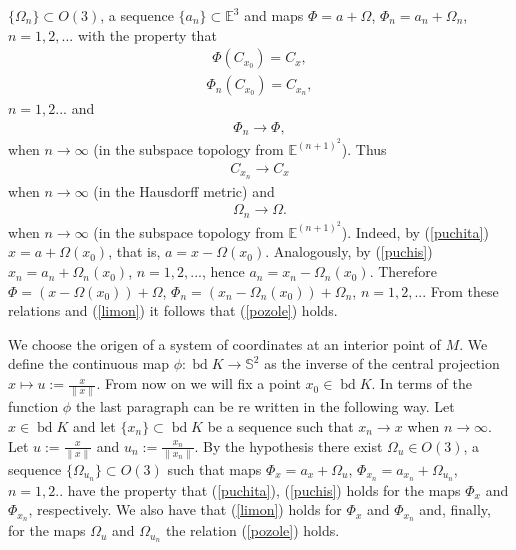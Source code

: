 \documentclass[12pt]{amsart}
\newcommand{\bd}{\operatorname*{bd}}
\begin{document}
$\{\Omega_n\}\subset O(3)$, a sequence $\{a_n\}\subset \mathbb{E}^3$ and maps $\Phi=a+\Omega$, $\Phi_n=a_n+\Omega_n$, $n=1,2,...$ with the property that 
\begin{eqnarray}\label{puchita}
\Phi(C_{x_0})=C_x, 
\end{eqnarray}
\begin{eqnarray}\label{puchis}
\Phi_n(C_{x_0})=C_{x_n},
\end{eqnarray}
$n=1,2...$ and 
\begin{eqnarray}\label{limon}
\Phi_{n} \rightarrow \Phi,
\end{eqnarray} 
when $n \rightarrow \infty$ (in the subspace topology from $\mathbb{E}^{(n+1)^2}$). Thus
\begin{eqnarray}\label{pompita}
C_{x_n} \rightarrow C_x
\end{eqnarray}
when $n \rightarrow \infty$ (in the Hausdorff metric) and
\begin{eqnarray}\label{pozole}
\Omega_{n} \rightarrow \Omega.
\end{eqnarray} 
when $n \rightarrow \infty$ (in the subspace topology from $\mathbb{E}^{(n+1)^2}$). Indeed, by (\ref{puchita}) $x= a+\Omega(x_0)$, that is, $a=x-\Omega(x_0)$. Analogously, by (\ref{puchis}) $x_n= a_n+\Omega_n(x_0)$, $n=1,2,...$, hence $a_n=x_n-\Omega_n(x_0)$. Therefore
$\Phi=(x-\Omega(x_0))+\Omega$, $\Phi_n=(x_n-\Omega_n(x_0))+\Omega_n$, $n=1,2,...$ From these relations and (\ref{limon}) it follows that (\ref{pozole}) holds.

We choose the origen of a system of coordinates at an interior point of $M$. We define the continuous map $\phi:\bd K \rightarrow \mathbb{S}^2$ as the inverse of the central projection $x\mapsto u:=\frac{x}{\|x\|}$. From now on we will fix a point $x_0\in \bd K$. In terms of the function $\phi$ the last paragraph can be re written in the following way. Let $x\in \bd K$ and let $\{x_n\}\subset \bd K$ be a sequence such that $x_n\rightarrow x$ when $n \rightarrow \infty$. Let $u:=\frac{x}{\|x\|}$ and $u_n:=\frac{x_n}{\|x_n\|}$. By the hypothesis there exist $\Omega_{u}\in O(3)$, a sequence  $\{\Omega_{u_n}\} \subset O(3)$ such that maps $\Phi_x=a_x+\Omega_{u}$, $\Phi_{x_n}=a_{x_n}+\Omega_{u_n}$, $n=1,2..$ have the property that (\ref{puchita}), (\ref{puchis}) holds for the maps $\Phi_x$ and $\Phi_{x_n}$, respectively. We also have that (\ref{limon}) holds for $\Phi_x$ and $\Phi_{x_n}$ and, finally, for the maps $\Omega_{u}$ and  
$\Omega_{u_n}$ the relation (\ref{pozole}) holds. 
\end{document}

